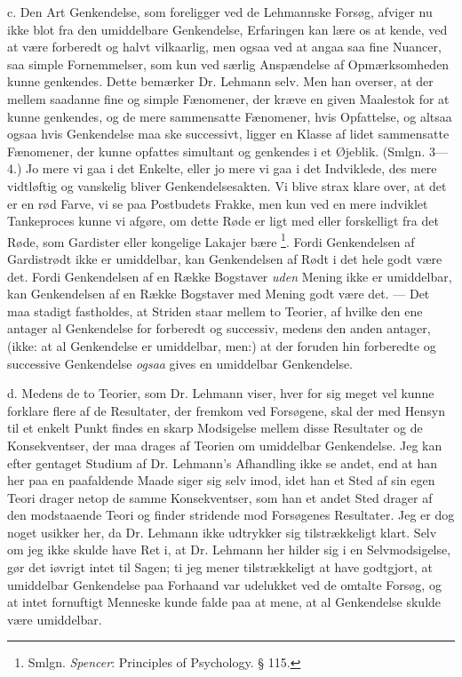\documentclass[12pt,a4paper,openany]{book}
\newcommand{\opage}[1]{\marginnote{\footnotesize\textit{[#1]}}}
\begin{document}
c. Den Art Genkendelse, som foreligger ved de Lehmannske Forsøg, afviger nu
ikke blot fra den umiddelbare Genkendelse, Erfaringen kan lære os at kende, ved
at være forberedt og halvt vilkaarlig, men ogsaa ved at angaa saa fine Nuancer,
saa simple Fornemmelser, som kun ved særlig Anspændelse af Opmærksomheden kunne
genkendes. Dette bemærker Dr. Lehmann selv. Men han overser, at der mellem
saadanne fine og simple Fænomener, der kræve en given Maalestok for at kunne
genkendes, og de mere sammensatte Fænomener, hvis Opfattelse, og altsaa ogsaa
hvis Genkendelse maa ske successivt, ligger en Klasse af lidet sammensatte
Fænomener, der kunne opfattes simultant og genkendes i et Øjeblik. (Smlgn.
3---4.) Jo mere vi gaa i det Enkelte, eller jo mere vi gaa i det Indviklede,
des mere vidtløftig og vanskelig bliver Genkendelsesakten. Vi blive strax klare
over, at det er en rød Farve, vi se paa Postbudets Frakke, men kun ved en mere
\setcounter{footnote}{0}%
\opage{32}indviklet Tankeproces kunne vi afgøre, om dette Røde er ligt med
eller forskelligt fra det Røde, som Gardister eller kongelige Lakajer bære%
\footnote[1]{Smlgn. \emph{Spencer}: Principles of Psychology. § 115.}. Fordi
Genkendelsen af Gardistrødt ikke er umiddelbar, kan Genkendelsen af Rødt i det
hele godt være det. Fordi Genkendelsen af en Række Bogstaver \emph{uden} Mening
ikke er umiddelbar, kan Genkendelsen af en Række Bogstaver med Mening godt være
det. --- Det maa stadigt fastholdes, at Striden staar mellem to Teorier, af
hvilke den ene antager al Genkendelse for forberedt og successiv, medens den
anden antager, (ikke: at al Genkendelse er umiddelbar, men:) at der foruden hin
forberedte og successive Genkendelse \emph{ogsaa} gives en umiddelbar Genkendelse.

d. Medens de to Teorier, som Dr. Lehmann viser, hver for sig meget vel kunne
forklare flere af de Resultater, der fremkom ved Forsøgene, skal der med Hensyn
til et enkelt Punkt findes en skarp Modsigelse mellem disse Resultater og de
Konsekventser, der maa drages af Teorien om umiddelbar Genkendelse. Jeg kan
efter gentaget Studium af Dr. Lehmann's Afhandling ikke se andet, end at han
her paa en paafaldende Maade siger sig selv imod, idet han et Sted af sin egen
Teori drager netop de samme Konsekventser, som han et andet Sted drager af den
modstaaende Teori og finder stridende mod Forsøgenes Resultater. Jeg er dog
noget usikker her, da Dr. Lehmann ikke udtrykker sig tilstrækkeligt klart. Selv
om jeg ikke skulde have Ret i, at Dr. Lehmann her hilder sig i en
Selvmodsigelse, gør det iøvrigt intet til Sagen; ti jeg mener tilstrækkeligt at
have godtgjort, at umiddelbar Genkendelse paa Forhaand var udelukket ved de
omtalte Forsøg, og at intet fornuftigt Menneske kunde falde paa at mene, at al
Genkendelse skulde være umiddelbar.
\end{document}
